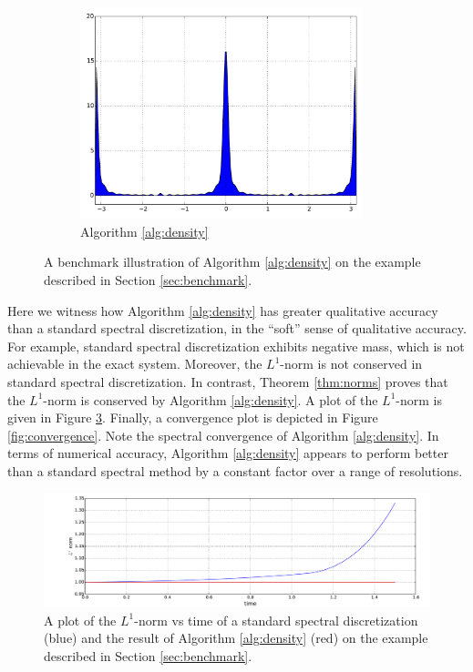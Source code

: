 \documentclass[final,leqno]{siamltex1213}
\begin{document}
\begin{figure}
\begin{subfigure}{0.36\textwidth}
		\includegraphics[width=0.9\textwidth]{./images/gn_spectral_1D.pdf}
		\caption{Algorithm \ref{alg:density}}
		\label{fig:gn spectral}
	\end{subfigure}
	\caption{A benchmark illustration of Algorithm \ref{alg:density} on the example described in Section \ref{sec:benchmark}.}
	\label{fig:S1}
\end{figure}

Here we witness how Algorithm \ref{alg:density} has greater qualitative accuracy than a standard spectral discretization, in the ``soft'' sense of qualitative accuracy.
For example, standard spectral discretization exhibits negative mass, which is not achievable in the exact system.
Moreover, the $L^{1}$-norm is not conserved in standard spectral discretization.  
In contrast, Theorem \ref{thm:norms} proves that the $L^{1}$-norm is conserved by Algorithm \ref{alg:density}.
A plot of the $L^{1}$-norm is given in Figure \ref{fig:L1}.
Finally, a convergence plot is depicted in Figure \ref{fig:convergence}.  
Note the spectral convergence of Algorithm \ref{alg:density}.
In terms of numerical accuracy, Algorithm \ref{alg:density} appears to perform better than a standard spectral method by a constant factor over a range of resolutions.

\begin{figure}
	\hspace*{-1.2cm}
	\centering
	\includegraphics[width=\textwidth]{./images/L1_plot.pdf}
	\caption{A plot of the $L^{1}$-norm vs time of a standard spectral discretization (blue) and the result of Algorithm \ref{alg:density} (red) on the example described in Section \ref{sec:benchmark}.}
	\label{fig:L1}
\end{figure}
\end{document}
